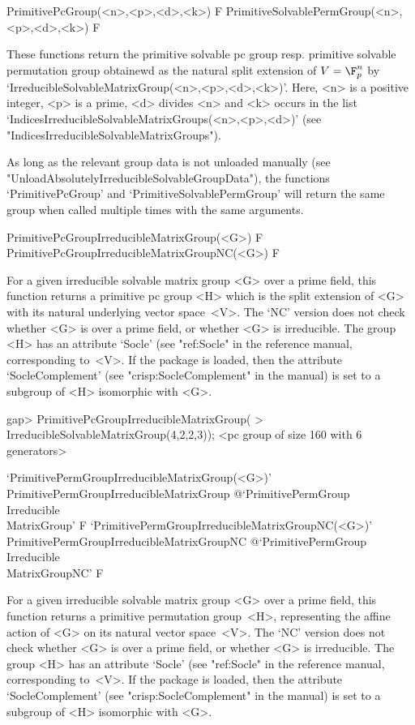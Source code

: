 \>PrimitivePcGroup(<n>,<p>,<d>,<k>) F
\>PrimitiveSolvablePermGroup(<n>,<p>,<d>,<k>) F

These functions return the primitive solvable pc group resp. primitive solvable 
permutation group obtainewd as the natural split extension of $V = \F_p^n$ by
`IrreducibleSolvableMatrixGroup(<n>,<p>,<d>,<k>)'. Here, <n> is a positive 
integer, <p> is a prime, <d> divides <n> and <k> occurs in the list 
`IndicesIrreducibleSolvableMatrixGroups(<n>,<p>,<d>)' 
(see "IndicesIrreducibleSolvableMatrixGroups").

As long as the relevant group data is not unloaded manually 
(see "UnloadAbsolutelyIrreducibleSolvableGroupData"), the functions `PrimitivePcGroup'
and `PrimitiveSolvablePermGroup' will return the same group when called multiple times
with the same arguments.


\>PrimitivePcGroupIrreducibleMatrixGroup(<G>) F
\>PrimitivePcGroupIrreducibleMatrixGroupNC(<G>) F

For a given irreducible solvable matrix group <G> over a prime field, this function
returns a primitive pc group <H> which is the split extension of <G> with its natural
underlying vector space~<V>. The `NC' version does not check whether <G> is over a prime field, 
or whether <G> is irreducible. The group <H> has an attribute `Socle' (see "ref:Socle" 
in the {\GAP} reference manual, corresponding to~<V>. If the package {\CRISP} is loaded, 
then the attribute `SocleComplement' (see "crisp:SocleComplement" in the {\CRISP} manual) is set to a subgroup of 
<H> isomorphic with <G>.

\beginexample
gap> PrimitivePcGroupIrreducibleMatrixGroup(
>       IrreducibleSolvableMatrixGroup(4,2,2,3));
<pc group of size 160 with 6 generators>
\endexample

\>`PrimitivePermGroupIrreducibleMatrixGroup(<G>)'%
{PrimitivePermGroupIrreducibleMatrixGroup}%
@{`PrimitivePermGroup\\Irreducible\\MatrixGroup'} F
\>`PrimitivePermGroupIrreducibleMatrixGroupNC(<G>)'%
{PrimitivePermGroupIrreducibleMatrixGroupNC}%
@{`PrimitivePermGroup\\Irreducible\\MatrixGroupNC'} F

For a given irreducible solvable matrix group <G> over a prime field, this function
returns a primitive permutation group~<H>, representing the affine action of <G> on its natural
vector space~<V>. The `NC' version does not check whether <G> is over a prime field, 
or whether <G> is irreducible. The group <H> has an attribute `Socle' (see "ref:Socle" 
in the {\GAP} reference manual, corresponding to~<V>. If the package {\CRISP} is loaded, 
then the attribute `SocleComplement' (see "crisp:SocleComplement" in the {\CRISP} manual) is set to a subgroup of 
<H> isomorphic with <G>.

